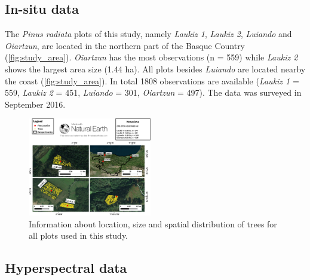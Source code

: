 \documentclass[letterpaper, peerreview]{IEEEtran}
\begin{document}
\subsection{In-situ data}

\noindent The \textit{Pinus radiata} plots of this study, namely \textit{Laukiz 1}, \textit{Laukiz 2}, \textit{Luiando} and \textit{Oiartzun}, are located in the northern part of the Basque Country (\autoref{fig:study_area}).
\textit{Oiartzun} has the most observations (n = 559) while \textit{Laukiz 2} shows the largest area size (1.44 ha).
All plots besides \textit{Luiando} are located nearby the coast (\autoref{fig:study_area}).
In total 1808 observations are available (\textit{Laukiz 1} = 559, \textit{Laukiz 2} = 451, \textit{Luiando} = 301, \textit{Oiartzun} = 497).
The data was surveyed in September 2016.

\begin{figure} [t!]
	\begin{center}
		\centering
		\includegraphics[width=0.48\textwidth] {study-area-hyperspectral.pdf}
		\caption{Information about location, size and spatial distribution of trees for all plots used in this study.}\label{fig:study_area}
	\end{center}
\end{figure}



\subsection{Hyperspectral data}
\end{document}
